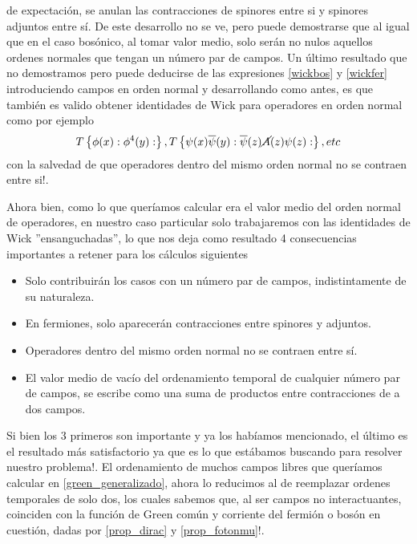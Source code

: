 \documentclass{article}
\numberwithin{equation}{section}
\begin{document}
de expectación, se anulan las contracciones de spinores entre si y
spinores adjuntos entre sí. De este desarrollo no se ve, pero puede
demostrarse que al igual que en el caso bosónico, al tomar valor medio,
solo serán no nulos aquellos ordenes normales que tengan un número
par de campos. Un último resultado que no demostramos pero puede deducirse
de las expresiones \ref{wickbos} y \ref{wickfer} introduciendo campos en orden normal y
desarrollando como antes, es que también es valido obtener identidades
de Wick para operadores en orden normal como por ejemplo
\begin{equation}
T\left\{ \phi(x):\phi^{4}(y):\right\} ,T\left\{ \psi(x)\overline{\psi}(y):\overline{\psi}(z)\cancel{A}(z)\psi(z):\right\} ,etc
\end{equation}
con la salvedad de que operadores dentro del mismo orden normal no
se contraen entre si!.

Ahora bien, como lo que queríamos calcular era el valor medio del
orden normal de operadores, en nuestro caso particular solo trabajaremos con las identidades
de Wick ''ensanguchadas'', lo que nos deja como resultado 4 consecuencias
importantes a retener para los cálculos siguientes

\begin{itemize}
	\item Solo contribuirán los casos con un número par de campos, indistintamente
	de su naturaleza.
	\item En fermiones, solo aparecerán contracciones entre spinores y adjuntos.
	\item Operadores dentro del mismo orden normal no se contraen entre sí.
	\item El valor medio de vacío del ordenamiento temporal de cualquier número
	par de campos, se escribe como una suma de productos entre contracciones
	de a dos campos.
\end{itemize}

Si bien los 3 primeros son importante y ya los habíamos mencionado,
el último es el resultado más satisfactorio ya que es lo que estábamos
buscando para resolver nuestro problema!. El ordenamiento de muchos
campos libres que queríamos calcular en \ref{green_generalizado}, ahora lo reducimos al de reemplazar ordenes temporales de solo
dos, los cuales sabemos que, al ser campos no interactuantes, coinciden con la función de Green común
y corriente del fermión o bosón en cuestión, dadas por \ref{prop_dirac} y \ref{prop_fotonmu}!. 
\end{document}
